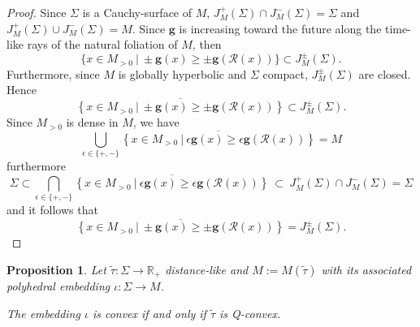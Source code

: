 \documentclass[a4paper,12pt]{article}
\def\R{\mathbb{R}}
\def\RR{\mathbb{R}}
\def\R{\mathcal R}
\def\quadform{\mathbf{g}}
\newtheorem{prop}[lem]{Proposition}
\theoremstyle{definition}
\begin{document}
		\begin{proof}
		Since $\Sigma$ is a Cauchy-surface of $M$, $J^+_M(\Sigma)\cap J^-_M(\Sigma) = \Sigma$ and $J^+_M(\Sigma)\cup J^-_M(\Sigma) = M$. 
		Since $\quadform$ is increasing toward the future along the time-like rays of the natural foliation of $M$, then $$\{x\in M_{>0}~|~ \pm \quadform(x)\geq \pm \quadform(\R(x))\} \subset J^\pm_M(\Sigma).$$ Furthermore, since $M$ is globally hyperbolic and $\Sigma$ compact, $J^{\pm}_M(\Sigma)$ are closed. Hence 
		$$ \overline{\left\{x\in M_{>0}~|~ \pm \quadform(x)\geq \pm \quadform(\R(x))\right\}} \subset J^\pm_M(\Sigma).$$
		Since $M_{>0}$ is dense in $M$, we have 
		$$ \bigcup_{\epsilon \in \{+,-\}}\overline{\left\{x\in M_{>0}~|~ \epsilon \quadform(x)\geq \epsilon \quadform(\R(x))\right\}}= M $$
		furthermore 
		 $$\Sigma \subset \bigcap_{\epsilon \in \{+,-\}}\overline{\left\{x\in M_{>0}~|~ \epsilon \quadform(x)\geq \epsilon \quadform(\R(x))\right\}} ~\subset~ J^+_M(\Sigma)\cap J^-_M(\Sigma) = \Sigma$$
		and it follows that 
		$$ \overline{\left\{x\in M_{>0}~|~ \pm \quadform(x)\geq \pm \quadform(\R(x))\right\}} = J^\pm_M(\Sigma).$$\end{proof}

		 
					\begin{prop}\label{prop:conv_Q_conv}
						Let $\widetilde\tau:\Sigma \rightarrow \RR_+$ distance-like and $M:=M(\widetilde\tau)$ with its associated polyhedral embedding $\iota:\Sigma \rightarrow M$.

						The embedding $\iota$ is convex if and only if $\widetilde\tau$ is Q-convex.
					\end{prop}
\end{document}
